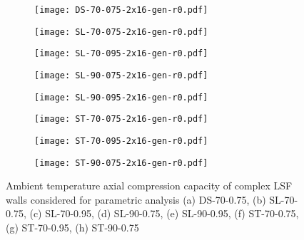 \begin{figure}[!htbp]
	\centering
	\begin{subfigure}[b]{0.4\textwidth}
			\centering
		\texttt{[image: DS-70-075-2x16-gen-r0.pdf]}
		\caption{}
		\label{subfig:DS-70-075-2x16-gen-r0}
	\end{subfigure}
	\begin{subfigure}[b]{0.4\textwidth}
			\centering
		\texttt{[image: SL-70-075-2x16-gen-r0.pdf]}
		\caption{}
		\label{subfig:SL-70-075-2x16-gen-r0}
	\end{subfigure}
	\begin{subfigure}[b]{0.4\textwidth}
			\centering
		\texttt{[image: SL-70-095-2x16-gen-r0.pdf]}
		\caption{}
		\label{subfig:SL-70-095-2x16-gen-r0}
	\end{subfigure}
	\begin{subfigure}[b]{0.4\textwidth}
			\centering
		\texttt{[image: SL-90-075-2x16-gen-r0.pdf]}
		\caption{}
		\label{subfig:SL-90-075-2x16-gen-r0}
	\end{subfigure}
	\begin{subfigure}[b]{0.4\textwidth}
			\centering
		\texttt{[image: SL-90-095-2x16-gen-r0.pdf]}
		\caption{}
		\label{subfig:SL-90-095-2x16-gen-r0}
	\end{subfigure}
	\begin{subfigure}[b]{0.4\textwidth}
			\centering
		\texttt{[image: ST-70-075-2x16-gen-r0.pdf]}
		\caption{}
		\label{subfig:ST-70-075-2x16-gen-r0}
	\end{subfigure}
	\begin{subfigure}[b]{0.4\textwidth}
			\centering
		\texttt{[image: ST-70-095-2x16-gen-r0.pdf]}
		\caption{}
		\label{subfig:ST-70-095-2x16-gen-r0}
	\end{subfigure}
	\begin{subfigure}[b]{0.4\textwidth}
			\centering
		\texttt{[image: ST-90-075-2x16-gen-r0.pdf]}
		\caption{}
		\label{subfig:ST-90-075-2x16-gen-r0}
	\end{subfigure}
	   \caption{Ambient temperature axial compression capacity of complex LSF walls considered for parametric analysis (a) DS-70-0.75, (b) SL-70-0.75, (c) SL-70-0.95, (d) SL-90-0.75, (e) SL-90-0.95, (f) ST-70-0.75, (g) ST-70-0.95, (h) ST-90-0.75}
	   \label{fig:ambient-capacity-parametric}
\end{figure}

